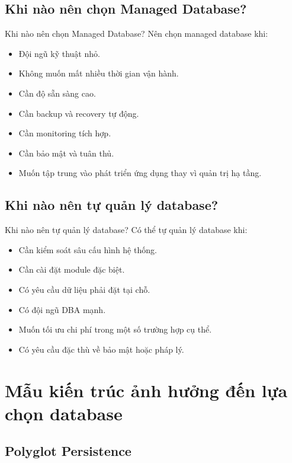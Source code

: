 \documentclass[aspectratio=169,11pt]{beamer}
\newcommand{\smallitem}{\setlength{\itemsep}{2pt}\setlength{\parskip}{0pt}}
\begin{document}
\subsection{Khi nào nên chọn Managed Database?}
\begin{frame}{Khi nào nên chọn Managed Database?}
Nên chọn managed database khi:
\begin{itemize}
  \smallitem
  \item Đội ngũ kỹ thuật nhỏ.
  \item Không muốn mất nhiều thời gian vận hành.
  \item Cần độ sẵn sàng cao.
  \item Cần backup và recovery tự động.
  \item Cần monitoring tích hợp.
  \item Cần bảo mật và tuân thủ.
  \item Muốn tập trung vào phát triển ứng dụng thay vì quản trị hạ tầng.
\end{itemize}
\end{frame}

\subsection{Khi nào nên tự quản lý database?}
\begin{frame}{Khi nào nên tự quản lý database?}
Có thể tự quản lý database khi:
\begin{itemize}
  \smallitem
  \item Cần kiểm soát sâu cấu hình hệ thống.
  \item Cần cài đặt module đặc biệt.
  \item Có yêu cầu dữ liệu phải đặt tại chỗ.
  \item Có đội ngũ DBA mạnh.
  \item Muốn tối ưu chi phí trong một số trường hợp cụ thể.
  \item Có yêu cầu đặc thù về bảo mật hoặc pháp lý.
\end{itemize}
\end{frame}

\section{Mẫu kiến trúc ảnh hưởng đến lựa chọn database}
\subsection{Polyglot Persistence}
\end{document}
